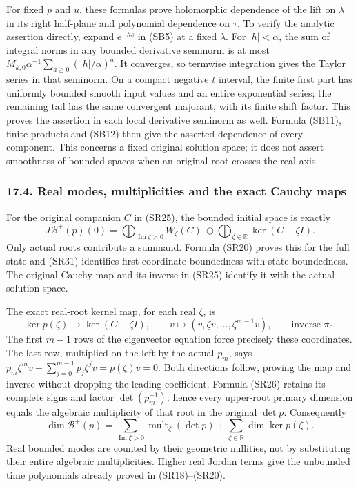 \documentclass[
  11pt,
]{article}
\begin{document}
For fixed \(p\) and \(u\), these formulas prove holomorphic dependence
of the lift on \(\lambda\) in its right half-plane and polynomial
dependence on \(\tau\). To verify the analytic assertion directly,
expand \(e^{-hs}\) in (SB5) at a fixed \(\lambda\). For \(|h|<\alpha\),
the sum of integral norms in any bounded derivative seminorm is at most
\(M_{k,0}\alpha^{-1}\sum_{a\geq0}(|h|/\alpha)^a\). It converges, so
termwise integration gives the Taylor series in that seminorm. On a
compact negative \(t\) interval, the finite first part has uniformly
bounded smooth input values and an entire exponential series; the
remaining tail has the same convergent majorant, with its finite shift
factor. This proves the assertion in each local derivative seminorm as
well. Formula (SB11), finite products and (SB12) then give the asserted
dependence of every component. This concerns a fixed original solution
space; it does not assert smoothness of bounded spaces when an original
root crosses the real axis.

\subsubsection{17.4. Real modes, multiplicities and the exact Cauchy
maps}\label{real-modes-multiplicities-and-the-exact-cauchy-maps}

For the original companion \(C\) in (SR25), the bounded initial space is
exactly \[
 J\mathcal B^+(p)(0)=
  \bigoplus_{\operatorname{Im}\zeta>0}W_\zeta(C)
  \ \oplus\!\bigoplus_{\zeta\in\mathbb R}\ker(C-\zeta I).
 \tag{SB18}
\] Only actual roots contribute a summand. Formula (SR20) proves this
for the full state and (SR31) identifies first-coordinate boundedness
with state boundedness. The original Cauchy map and its inverse in
(SR25) identify it with the actual solution space.

The exact real-root kernel map, for each real \(\zeta\), is \[
 \ker p(\zeta)\longrightarrow\ker(C-\zeta I),\qquad
 v\longmapsto(v,\zeta v,\ldots,\zeta^{m-1}v),
 \qquad\text{inverse }\pi_0.
 \tag{SB19}
\] The first \(m-1\) rows of the eigenvector equation force precisely
these coordinates. The last row, multiplied on the left by the actual
\(p_m\), says \(p_m\zeta^mv+\sum_{j=0}^{m-1}p_j\zeta^jv=p(\zeta)v=0\).
Both directions follow, proving the map and inverse without dropping the
leading coefficient. Formula (SR26) retains its complete signs and
factor \(\det(p_m^{-1})\); hence every upper-root primary dimension
equals the algebraic multiplicity of that root in the original
\(\det p\). Consequently \[
 \dim\mathcal B^+(p)
 =\sum_{\operatorname{Im}\zeta>0}
                     \operatorname{mult}_\zeta(\det p)
       +\sum_{\zeta\in\mathbb R}\dim\ker p(\zeta).
 \tag{SB20}
\] Real bounded modes are counted by their geometric nullities, not by
substituting their entire algebraic multiplicities. Higher real Jordan
terms give the unbounded time polynomials already proved in
(SR18)--(SR20).
\end{document}
